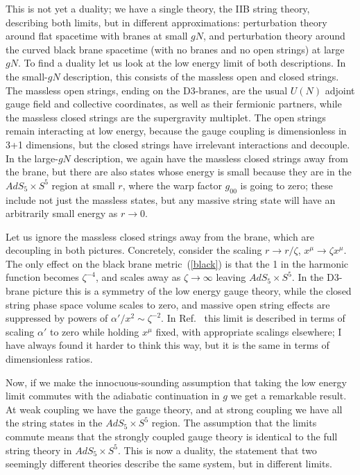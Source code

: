 \documentclass[12pt]{article}
\begin{document}
This is not yet a duality; we have a single theory, the IIB string theory, describing both limits, but in different approximations: perturbation theory around flat spacetime with branes at small $gN$, and perturbation theory around the curved black brane spacetime (with no branes and no open strings) at large $gN$.  To find a duality let us look at the low energy limit of both descriptions.  In the small-$gN$ description, this consists of the massless open and closed strings.  The massless open strings, ending on the D3-branes, are the usual $U(N)$ adjoint gauge field and collective coordinates, as well as their fermionic partners, while the massless closed strings are the supergravity multiplet.  The open strings remain interacting at low energy, because the gauge coupling is dimensionless in 3+1 dimensions, but the closed strings have irrelevant interactions and decouple.  In the large-$gN$ description, we again have the massless closed strings away from the brane, but there are also states whose energy is small because they are in the $AdS_5 \times S^5$ region at small $r$, where the warp factor $g_{00}$ is going to zero; these include not just the massless states, but any massive string state will have an arbitrarily small energy as $r \to 0$.  

Let us ignore the massless closed strings away from the brane, which are decoupling in both pictures.  Concretely, consider the scaling $r \to r/\zeta$, $x^\mu \to \zeta x^\mu$.  The only effect on the black brane metric~(\ref{black}) is that the 1 in the harmonic function becomes $\zeta^{-4}$, and scales away as $\zeta\to\infty$ leaving $AdS_5 \times S^5$.  In the D3-brane picture this is a symmetry of the low energy gauge theory, while the closed string phase space volume scales to zero, and massive open string effects are suppressed by powers of $\alpha'/x^2 \sim \zeta^{-2}$.  In Ref.~\cite{Maldacena:1997re} this limit is described in terms of scaling $\alpha'$ to zero while holding $x^\mu$ fixed, with appropriate scalings elsewhere; I have always found it harder to think this way, but it is the same in terms of dimensionless ratios.

Now, if we make the innocuous-sounding assumption that taking the low energy limit commutes with the adiabatic continuation in $g$ we get a remarkable result.  At weak coupling we have the gauge theory, and at strong coupling we have all the string states in the $AdS_5 \times S^5$ region.  The assumption that the limits commute means that the strongly coupled gauge theory is identical to the full string theory in $AdS_5 \times S^5$.  This is now a duality, the statement that two seemingly different theories describe the same system, but in different limits.
\end{document}
